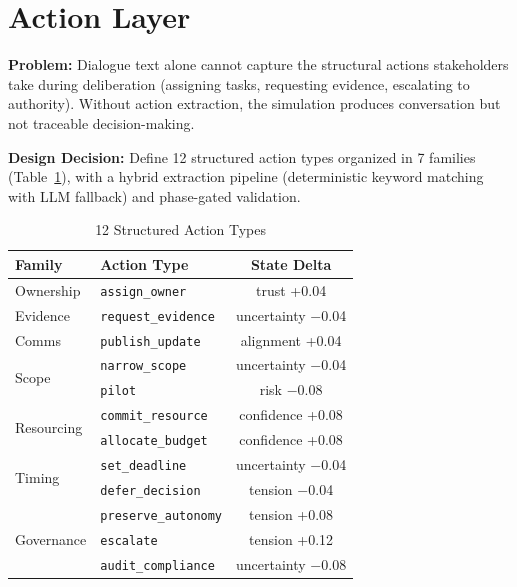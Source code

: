 \section{Action Layer}

\textbf{Problem:} Dialogue text alone cannot capture the structural actions stakeholders take during deliberation (assigning tasks, requesting evidence, escalating to authority). Without action extraction, the simulation produces conversation but not traceable decision-making.

\textbf{Design Decision:} Define 12 structured action types organized in 7 families (Table~\ref{tab:actions}), with a hybrid extraction pipeline (deterministic keyword matching with LLM fallback) and phase-gated validation.

\begin{table}[t]
\centering
\caption{12 Structured Action Types}
\label{tab:actions}
\begin{tabular}{llc}
\toprule
Family & Action Type & State Delta \\
\midrule
Ownership   & \texttt{assign\_owner}      & trust +0.04 \\
Evidence    & \texttt{request\_evidence}   & uncertainty $-$0.04 \\
Comms       & \texttt{publish\_update}     & alignment +0.04 \\
\multirow{2}{*}{Scope}
            & \texttt{narrow\_scope}       & uncertainty $-$0.04 \\
            & \texttt{pilot}               & risk $-$0.08 \\
\multirow{2}{*}{Resourcing}
            & \texttt{commit\_resource}    & confidence +0.08 \\
            & \texttt{allocate\_budget}    & confidence +0.08 \\
\multirow{2}{*}{Timing}
            & \texttt{set\_deadline}       & uncertainty $-$0.04 \\
            & \texttt{defer\_decision}     & tension $-$0.04 \\
\multirow{3}{*}{Governance}
            & \texttt{preserve\_autonomy}  & tension +0.08 \\
            & \texttt{escalate}            & tension +0.12 \\
            & \texttt{audit\_compliance}   & uncertainty $-$0.08 \\
\bottomrule
\end{tabular}
\end{table}

